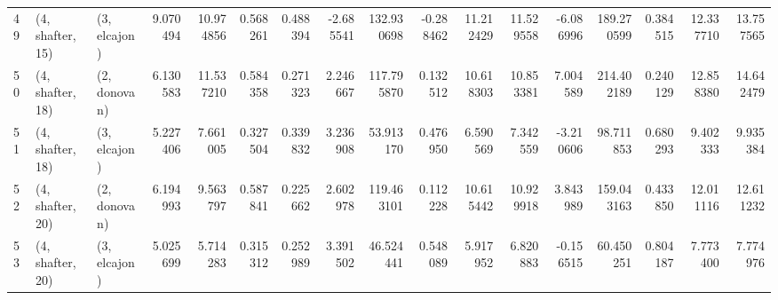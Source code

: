 \begin{tabular}{lllrrrrrrrrrrrrrr}
49 &  (4, shafter, 15) &     (3, elcajon) &   9.070494 &  10.974856 &   0.568261 &  0.488394 & -2.685541 &   132.930698 &  -0.288462 &  11.212429 &  11.529558 &  -6.086996 &  189.270599 &  0.384515 &  12.337710 &  13.757565 \\
50 &  (4, shafter, 18) &     (2, donovan) &   6.130583 &  11.537210 &   0.584358 &  0.271323 &  2.246667 &   117.795870 &   0.132512 &  10.618303 &  10.853381 &   7.004589 &  214.402189 &  0.240129 &  12.858380 &  14.642479 \\
51 &  (4, shafter, 18) &     (3, elcajon) &   5.227406 &   7.661005 &   0.327504 &  0.339832 &  3.236908 &    53.913170 &   0.476950 &   6.590569 &   7.342559 &  -3.210606 &   98.711853 &  0.680293 &   9.402333 &   9.935384 \\
52 &  (4, shafter, 20) &     (2, donovan) &   6.194993 &   9.563797 &   0.587841 &  0.225662 &  2.602978 &   119.463101 &   0.112228 &  10.615442 &  10.929918 &   3.843989 &  159.043163 &  0.433850 &  12.011116 &  12.611232 \\
53 &  (4, shafter, 20) &     (3, elcajon) &   5.025699 &   5.714283 &   0.315312 &  0.252989 &  3.391502 &    46.524441 &   0.548089 &   5.917952 &   6.820883 &  -0.156515 &   60.450251 &  0.804187 &   7.773400 &   7.774976 \\
\bottomrule
\end{tabular}
